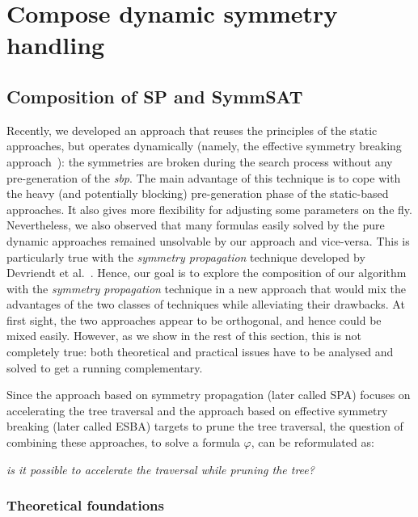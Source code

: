 \chapter{Compose dynamic symmetry handling}
\minitoc

\section{Composition of SP and SymmSAT}

Recently, we developed an approach that reuses the
principles of the static approaches, but operates dynamically (namely, the effective symmetry breaking approach~\cite{metin2018cdclsym}):
 the symmetries are broken during the search process without any pre-generation of the \textit{sbp}. The main
advantage of this technique is to cope with the heavy (and potentially
blocking) pre-generation phase of the static-based approaches. It also gives
more flexibility for adjusting some parameters on the fly. 
Nevertheless, we also observed that many formulas easily solved by the pure
dynamic approaches remained unsolvable by our approach and vice-versa. This is
particularly true with the \textit{symmetry propagation} technique developed by
Devriendt et al.~\cite{Devriendt12}.
Hence, our goal is to explore the composition of our algorithm with the  \textit{symmetry propagation} technique in
a new approach that would mix the advantages of the two classes of techniques while alleviating their drawbacks. At first sight,
the two approaches appear to be orthogonal, and hence could be mixed easily. However, as we show in the rest of this section,
this is not completely true: both theoretical and practical issues have to be analysed and solved to get a
running complementary. 


Since the approach based on symmetry propagation (later called SPA) focuses on
accelerating the tree traversal and the approach based on effective symmetry
breaking (later called ESBA) targets to prune the tree traversal, the question of combining these approaches, to solve a formula $\varphi$, can
be reformulated as: 

\begin{center}
	\textit{is it possible to accelerate the traversal while pruning the tree?}
\end{center}


\subsection{Theoretical foundations}
\label{sec:tf}

